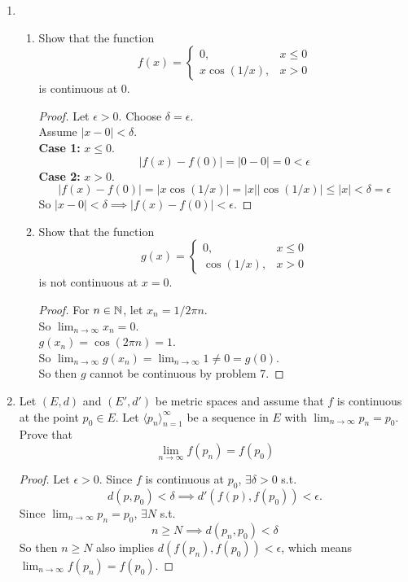 \documentclass[14pt]{extarticle}
\begin{document}
\begin{enumerate}
		\item
		\begin{enumerate}
			\item Show that the function
			\begin{equation}
				f(x)=
				\begin{cases}
					0, & x \leq 0\\
					x\cos(1/x), & x > 0
				\end{cases}
			\end{equation}
			is continuous at 0.
			\begin{proof}
				Let $\epsilon > 0$. Choose $\delta = \epsilon$.\\
				Assume $|x - 0| < \delta$.\\
				\textbf{Case 1:} $x \leq 0$.\\
				\[|f(x)-f(0)| = |0 - 0| = 0 < \epsilon\]
				\textbf{Case 2:} $x > 0$.\\
				\[|f(x)-f(0)| = |x\cos(1/x)| = |x||\cos(1/x)| \leq |x| < \delta = \epsilon\]
				So $|x-0| < \delta \implies |f(x)-f(0)| < \epsilon$.
			\end{proof}
			
			\item Show that the function
			\begin{equation}
				g(x)=
				\begin{cases}
					0, & x \leq 0\\
					\cos(1/x), & x > 0
				\end{cases}
			\end{equation}
			is not continuous at $x=0$.
			\begin{proof}
				For $n\in\mathbb{N}$, let $x_n = 1/2\pi n$.\\
				So $\lim_{n\rightarrow\infty} x_n = 0$.\\
				$g(x_n) = \cos(2\pi n) = 1$.\\
				So $\lim_{n\rightarrow\infty} g(x_n) = \lim_{n\rightarrow\infty} 1 \neq 0 = g(0)$.\\
				So then $g$ cannot be continuous by problem 7.
			\end{proof}
		\end{enumerate}
		
		\item Let $(E,d)$ and $(E',d')$ be metric spaces and assume that $f$ is continuous at the point $p_0 \in E$. Let $\langle p_n \rangle_{n=1}^\infty$ be a sequence in $E$ with $\lim_{n\rightarrow\infty} p_n = p_0$. Prove that
		\[\lim_{n\rightarrow\infty} f(p_n) = f(p_0)\]
		\begin{proof}
			Let $\epsilon > 0$. Since $f$ is continuous at $p_0$, $\exists \delta>0$ s.t.
			\[d(p,p_0) < \delta \implies d'(f(p),f(p_0)) < \epsilon.\]
			Since $\lim_{n\rightarrow\infty} p_n = p_0$, $\exists N$ s.t. 
			\[n \geq N \implies d(p_n, p_0) < \delta\]
			So then $n \geq N$ also implies $d(f(p_n),f(p_0)) < \epsilon$, which means $\lim_{n\rightarrow\infty} f(p_n) = f(p_0)$.
		\end{proof}
	\end{enumerate}
\end{document}
